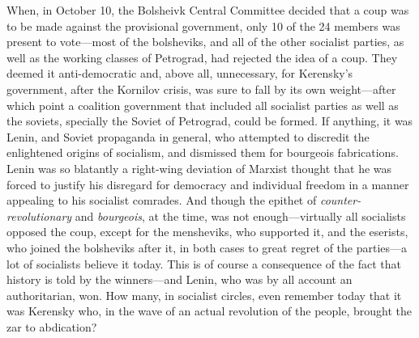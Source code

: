 \documentclass[a4paper]{article}
\begin{document}
When, in October 10, the
Bolsheivk Central Committee decided that a coup was to be made against the
provisional government, only 10 of the 24 members was present to vote---most of
the bolsheviks, and all of the other socialist parties, as well as the working
classes of Petrograd, had rejected the idea of a coup. They deemed it
anti-democratic and, above all, unnecessary, for Kerensky's government, after
the Kornilov crisis, was sure to fall by its own weight---after which point a
coalition government that included all socialist parties as well as the soviets,
specially the Soviet of Petrograd, could be formed. If anything, it was
Lenin, and Soviet propaganda in general, who attempted to discredit the
enlightened origins of socialism, and dismissed them for bourgeois fabrications.
Lenin was so blatantly a right-wing deviation of Marxist thought that he was
forced to justify his disregard for democracy and individual freedom in a manner
appealing to his socialist comrades. And though the epithet of
\textit{counter-revolutionary} and \textit{bourgeois}, at the time, was not
enough---virtually all socialists opposed the coup, except for the mensheviks,
who supported it, and the eserists, who joined the bolsheviks after it, in both
cases to great regret of the parties---a lot of socialists believe it today.
This is of course a consequence of the fact that history is told by the
winners---and Lenin, who was by all account an authoritarian, won. How many, in
socialist circles, even remember today that it was Kerensky who, in the wave of
an actual revolution of the people, brought the zar to abdication?




    
\end{document}

